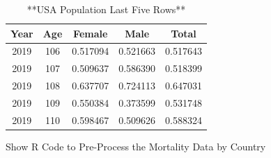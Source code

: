 \documentclass[
]{book}
\begin{document}
\begin{table}

\caption{\label{tab:unnamed-chunk-35}**USA Population Last Five Rows**}
\centering
\begin{tabular}[t]{c|c|c|c|c}
\hline
Year & Age & Female & Male & Total\\
\hline
2019 & 106 & 0.517094 & 0.521663 & 0.517643\\
\hline
2019 & 107 & 0.509637 & 0.586390 & 0.518399\\
\hline
2019 & 108 & 0.637707 & 0.724113 & 0.647031\\
\hline
2019 & 109 & 0.550384 & 0.373599 & 0.531748\\
\hline
2019 & 110 & 0.598467 & 0.509626 & 0.588324\\
\hline
\end{tabular}
\end{table}

Show R Code to Pre-Process the Mortality Data by Country
\end{document}
